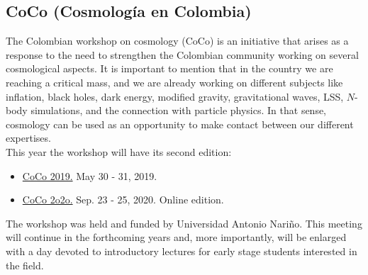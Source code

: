 \documentclass[a4paper,11pt]{article}
\begin{document}
\begin{enumerate}
%
\end{enumerate}

\subsection*{CoCo (Cosmología en Colombia)}
The Colombian workshop on cosmology (CoCo) is an initiative that arises as a response  to the need to strengthen the Colombian community working on several cosmological aspects. It is important to mention that in the country we are reaching a critical mass, and we are already working on different subjects like inflation, black holes, dark energy, modified gravity, gravitational waves, LSS, $N$-body simulations, and the connection with particle physics. In that sense, cosmology can be used as an opportunity to make contact between our different expertises.\\
This year the workshop will have its second edition:
\begin{itemize}
\item 
\href{https://indico.cern.ch/e/coco2019}{CoCo 2019.}
May 30 - 31, 2019. %
%
\item
\href{https://indico.cern.ch/e/coco2020}{CoCo 2o2o.}
Sep. 23 - 25, 2020. Online edition. 
\end{itemize}

The workshop was held and funded by Universidad Antonio Nariño. 
This meeting will continue in the forthcoming years and, more importantly, will be enlarged with a day devoted to introductory lectures for early stage students interested in the field.
\end{document}
